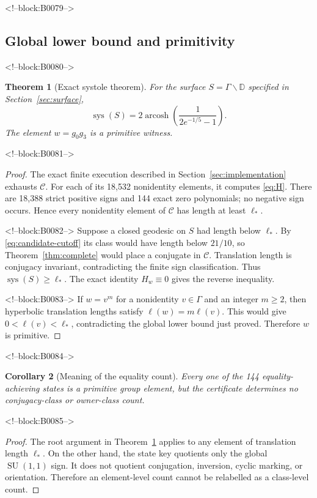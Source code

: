 \documentclass[11pt,a4paper]{article}
\newtheorem{theorem}{Theorem}[section]
\newtheorem{corollary}[theorem]{Corollary}
\theoremstyle{definition}
\newcommand{\D}{\mathbb D}
\newcommand{\SU}{\operatorname{SU}}
\newcommand{\arcosh}{\operatorname{arcosh}}
\newcommand{\sys}{\operatorname{sys}}
\newcommand{\length}{\ell}
\begin{document}
<!--block:B0079-->
\subsection{Global lower bound and primitivity}

<!--block:B0080-->
\begin{theorem}[Exact systole theorem]\label{thm:systole}
For the surface \(S=\Gamma\backslash\D\) specified in
Section~\ref{sec:surface},
\[
 \sys(S)=2\arcosh\!\left(\frac{1}{2e^{-1/5}-1}\right).
\]
The element \(w=g_0g_3\) is a primitive witness.
\end{theorem}

<!--block:B0081-->
\begin{proof}
The exact finite execution described in Section~\ref{sec:implementation}
exhausts \(\mathcal C\).  For each of its 18,532 nonidentity elements, it
computes \eqref{eq:H}.  There are 18,388 strict positive signs and 144 exact
zero polynomials; no negative sign occurs.  Hence every nonidentity element
of \(\mathcal C\) has length at least \(\length_*\).

<!--block:B0082-->
Suppose a closed geodesic on \(S\) had length below \(\length_*\).  By
\eqref{eq:candidate-cutoff} its class would have length below \(21/10\), so
Theorem~\ref{thm:complete} would place a conjugate in \(\mathcal C\).
Translation length is conjugacy invariant, contradicting the finite sign
classification.  Thus \(\sys(S)\geq\length_*\).  The exact identity
\(H_w\equiv0\) gives the reverse inequality.

<!--block:B0083-->
If \(w=v^m\) for a nonidentity \(v\in\Gamma\) and an integer \(m\geq2\), then
hyperbolic translation lengths satisfy
\(\length(w)=m\length(v)\).  This would give
\(0<\length(v)<\length_*\), contradicting the global lower bound just proved.
Therefore \(w\) is primitive.
\end{proof}

<!--block:B0084-->
\begin{corollary}[Meaning of the equality count]
Every one of the 144 equality-achieving states is a primitive group element,
but the certificate determines no conjugacy-class or owner-class count.
\end{corollary}

<!--block:B0085-->
\begin{proof}
The root argument in Theorem~\ref{thm:systole} applies to any element of
translation length \(\length_*\).  On the other hand, the state key quotients
only the global \(\SU(1,1)\) sign.  It does not quotient conjugation, inversion,
cyclic marking, or orientation.  Therefore an element-level count cannot be
relabelled as a class-level count.
\end{proof}
\end{document}
